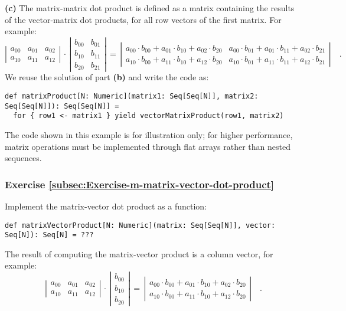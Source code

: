 \textbf{(c)} The matrix-matrix
dot product is defined as a matrix containing the results of the vector-matrix
dot products, for all row vectors of the first matrix. For example:
\[
\left|\begin{array}{ccc}
a_{00} & a_{01} & a_{02}\\
a_{10} & a_{11} & a_{12}
\end{array}\right|\,\cdot\,\left|\begin{array}{cc}
b_{00} & b_{01}\\
b_{10} & b_{11}\\
b_{20} & b_{21}
\end{array}\right|\,=\,\left|\begin{array}{cc}
a_{00}\cdot b_{00}+a_{01}\cdot b_{10}+a_{02}\cdot b_{20} & a_{00}\cdot b_{01}+a_{01}\cdot b_{11}+a_{02}\cdot b_{21}\\
a_{10}\cdot b_{00}+a_{11}\cdot b_{10}+a_{12}\cdot b_{20} & a_{10}\cdot b_{01}+a_{11}\cdot b_{11}+a_{12}\cdot b_{21}
\end{array}\right|\quad.
\]
We reuse the solution of part \textbf{(b)} and write the code as:
\begin{lstlisting}
def matrixProduct[N: Numeric](matrix1: Seq[Seq[N]], matrix2: Seq[Seq[N]]): Seq[Seq[N]] =
  for { row1 <- matrix1 } yield vectorMatrixProduct(row1, matrix2)
\end{lstlisting}

The code shown in this example is for illustration only; for higher
performance, matrix operations must be implemented through flat arrays
rather than nested sequences.

\subsubsection{Exercise \label{subsec:Exercise-m-matrix-vector-dot-product}\ref{subsec:Exercise-m-matrix-vector-dot-product}}

Implement the matrix-vector dot product as a function:
\begin{lstlisting}
def matrixVectorProduct[N: Numeric](matrix: Seq[Seq[N]], vector: Seq[N]): Seq[N] = ???
\end{lstlisting}
The result of computing the matrix-vector product is a column vector,
for example:
\[
\left|\begin{array}{ccc}
a_{00} & a_{01} & a_{02}\\
a_{10} & a_{11} & a_{12}
\end{array}\right|\,\cdot\,\left|\begin{array}{c}
b_{00}\\
b_{10}\\
b_{20}
\end{array}\right|\,=\,\left|\begin{array}{c}
a_{00}\cdot b_{00}+a_{01}\cdot b_{10}+a_{02}\cdot b_{20}\\
a_{10}\cdot b_{00}+a_{11}\cdot b_{10}+a_{12}\cdot b_{20}
\end{array}\right|\quad.
\]


